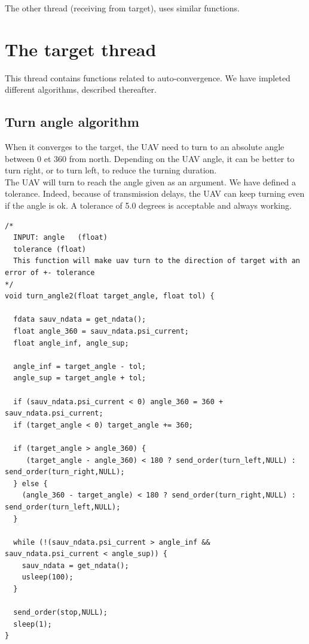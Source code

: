 The other thread (receiving from target), uses similar functions.

\section{The target thread}

This thread contains functions related to auto-convergence. We have impleted different algorithms, described thereafter.\\

\subsection{Turn angle algorithm}

When it converges to the target, the UAV need to turn to an absolute angle between 0 et 360 from north. Depending on the UAV angle, it can be better to turn right, or to turn left, to reduce the turning duration.\\

The UAV will turn to reach the angle given as an argument. We have defined a tolerance. Indeed, because of transmission delays, the UAV can keep turning even if the angle is ok. A tolerance of 5.0 degrees is acceptable and always working.\\

\begin{lstlisting}
/*
  INPUT: angle   (float)
  tolerance (float)
  This function will make uav turn to the direction of target with an error of +- tolerance     
*/
void turn_angle2(float target_angle, float tol) {

  fdata sauv_ndata = get_ndata();
  float angle_360 = sauv_ndata.psi_current;
  float angle_inf, angle_sup;

  angle_inf = target_angle - tol;
  angle_sup = target_angle + tol;

  if (sauv_ndata.psi_current < 0) angle_360 = 360 + sauv_ndata.psi_current;
  if (target_angle < 0) target_angle += 360;

  if (target_angle > angle_360) {
     (target_angle - angle_360) < 180 ? send_order(turn_left,NULL) : send_order(turn_right,NULL);
  } else {
    (angle_360 - target_angle) < 180 ? send_order(turn_right,NULL) : send_order(turn_left,NULL);
  }

  while (!(sauv_ndata.psi_current > angle_inf && sauv_ndata.psi_current < angle_sup)) {
    sauv_ndata = get_ndata();
    usleep(100);
  }
  
  send_order(stop,NULL);
  sleep(1);
}
\end{lstlisting}

